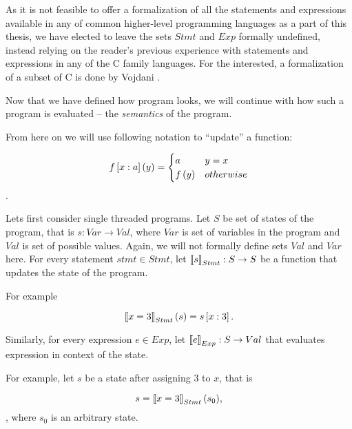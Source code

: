 \documentclass[..thesis.tex]{subfiles}
\begin{document}
As it is not feasible to offer a formalization of all the statements and expressions available in any of common higher-level programming languages
as a part of this thesis, we have elected to leave the sets $Stmt$ and $Exp$ formally undefined, instead relying on the reader's previous experience
with statements and expressions in any of the C family languages.   For the interested, a formalization of a subset of C is done by Vojdani .




Now that we have defined how program looks, we will continue with how such a program is evaluated -- the \textit{semantics} of the program.

From here on we will use following notation to ``update'' a function:

\begin{equation*}
f \left[ x : a \right] \left( y \right) = 
  \begin{cases}
  a & y = x \\
  f \left(  y \right) & otherwise \\ 
  \end{cases}
\end{equation*}.

Lets first consider single threaded programs. Let $S$ be set of states of the program, that is $s : Var \to Val$, where $Var$ is set of
variables in the program and $Val$ is set of possible values. Again, we will not formally define sets $Val$ and $Var$ here.
For every statement $stmt \in Stmt$, let $ \left\llbracket s \right\rrbracket_{Stmt} : S \to S$ be a function that updates the state of the program. 

For example

\begin{equation*}
 \left\llbracket x = 3 \right\rrbracket_{Stmt} (s) = s \left[ x : 3 \right] \text{.}
\end{equation*}

Similarly, for every expression $e \in Exp$, let $\left\llbracket e \right\rrbracket_{Exp} : S \to Val$ that evaluates expression in context of the state. 

For example, let $s$ be a state after assigning $3$ to $x$, that is

\begin{equation*}
s = \left\llbracket x = 3 \right\rrbracket_{Stmt} (s_0) \text{,}
\end{equation*},
where $s_0$ is an arbitrary state. 
\end{document}

